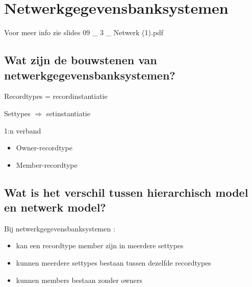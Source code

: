 \newpage

\section{Netwerkgegevensbanksystemen}

Voor meer info zie slides 09 \_ 3 \_ Netwerk (1).pdf

\subsection{Wat zijn de bouwstenen van netwerkgegevensbanksystemen?}

Recordtypes = recordinstantiatie

Settypes $\Rightarrow$ setinstantiatie

1:n verband

\begin{itemize}
\item Owner-recordtype
\item Member-recordtype
\end{itemize}
\subsection{Wat is het verschil tussen hierarchisch model en netwerk model?}

Bij netwerkgegevensbanksystemen :

\begin{itemize}
\item kan een recordtype member zijn in meerdere settypes
\item kunnen meerdere settypes bestaan tussen dezelfde recordtypes
\item kunnen members bestaan zonder owners
\end{itemize}